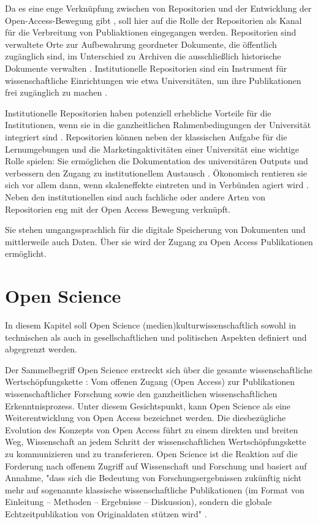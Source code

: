 Da es eine enge Verknüpfung zwischen von Repositorien und der Entwicklung der Open-Access-Bewegung gibt \cite{offhaus_2012_institutionelle_repos}, soll hier auf die Rolle der Repositorien als Kanal für die Verbreitung von Publiaktionen eingegangen werden. 
Repositorien sind verwaltete Orte zur Aufbewahrung geordneter Dokumente, die öffentlich zugänglich sind, im Unterschied zu Archiven die ausschließlich historische Dokumente verwalten \cite{suchen}. Institutionelle Repositorien sind ein Instrument für wissenschaftliche Einrichtungen wie etwa Universitäten, um ihre Publikationen frei zugänglich zu machen \cite{dobratz_2007_open}.

Institutionelle Repositorien haben potenziell erhebliche Vorteile für die Institutionen, wenn sie in die ganzheitlichen Rahmenbedingungen der Universität integriert sind \cite{steele_2006}. Repositorien können neben der klassischen Aufgabe für die Lernumgebungen und die Marketingaktivitäten einer Universität eine wichtige Rolle spielen: Sie ermöglichen die Dokumentation des universitären Outputs und verbessern den Zugang zu institutionellem Austausch \cite{steele_2006}. Ökonomisch rentieren sie sich vor allem dann, wenn skaleneffekte eintreten und in Verbünden agiert wird \cite{blythe_2005value}. Neben den institutionellen sind auch fachliche oder andere Arten von Repositorien eng mit der Open Access Bewegung verknüpft. 

Sie stehen umgangssprachlich für die digitale Speicherung von Dokumenten und mittlerweile auch Daten. Über sie wird der Zugang zu Open Access Publikationen ermöglicht.

\section{Open Science}
In diesem Kapitel soll Open Science (medien)kulturwissenschaftlich sowohl in technischen als auch in gesellschaftlichen und politischen Aspekten definiert und abgegrenzt werden.

Der Sammelbegriff Open Science erstreckt sich über die gesamte wissenschaftliche Wertschöpfungskette \cite{Scheliga_2014}: Vom offenen Zugang (Open Access) zur Publikationen wissenschaftlicher Forschung sowie den ganzheitlichen wissenschaftlichen Erkenntnisprozess. Unter diesem Gesichtspunkt, kann Open Science als eine Weiterentwicklung von Open Access bezeichnet werden. Die diesbezügliche Evolution des Konzepts von Open Access führt zu einem direkten und breiten Weg, Wissenschaft an jedem Schritt der wissenschaftlichen Wertschöpfungskette zu kommunizieren und zu transferieren. Open Science ist die Reaktion auf die Forderung nach offenem Zugriff auf Wissenschaft und Forschung und basiert auf Annahme, "dass sich die Bedeutung von Forschungsergebnissen zukünftig nicht mehr auf sogenannte klassische wissenschaftliche Publikationen (im Format von Einleitung – Methoden – Ergebnisse – Diskussion), sondern die globale Echtzeitpublikation von Originaldaten stützen wird" \cite{Stengel_2013}.

